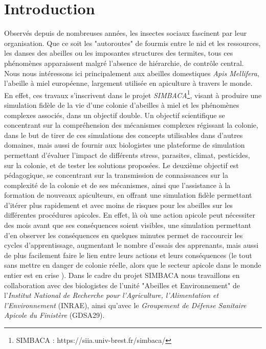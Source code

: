 \chapter*{Introduction}


	Observés depuis de nombreuses années, les insectes sociaux fascinent par leur organisation. Que ce soit les "autoroutes" de fourmis entre le nid et les ressources, les danses des abeilles ou les imposantes structures des termites, tous ces phénomènes apparaissent malgré l'absence de hiérarchie, de contrôle central. Nous nous intéressons ici principalement aux abeilles domestiques \textit{Apis Mellifera}, l'abeille à miel européenne, largement utilisée en apiculture à travers le monde. 
	En effet, ces travaux s'inscrivent dans le projet \textit{SIMBACA}\footnote{SIMBACA : https://siia.univ-brest.fr/simbaca/}, visant à produire une simulation fidèle de la vie d'une colonie d'abeilles à miel et les phénomènes complexes associés, dans un objectif double. Un objectif scientifique se concentrant sur la compréhension des mécanismes complexes régissant la colonie, dans le but de tirer de ces simulations des concepts utilisables dans d'autres domaines, mais aussi de fournir aux biologistes une plateforme de simulation permettant d'évaluer l'impact de différents stress, parasites, climat, pesticides, sur la colonie, et de tester les solutions proposées. 
	Le deuxième objectif est pédagogique, se concentrant sur la transmission de connaissances sur la complexité de la colonie et de ses mécanismes, ainsi que l'assistance à la formation de nouveaux apiculteurs, en offrant une simulation fidèle permettant d'itérer plus rapidement et avec moins de risques pour les abeilles sur les différentes procédures apicoles. En effet, là où une action apicole peut nécessiter des mois avant que ses conséquences soient visibles, une simulation permettant d'en observer les conséquences en quelques minutes permet de raccourcir les cycles d'apprentissage, augmentant le nombre d'essais des apprenants, mais aussi de plus facilement faire le lien entre leurs actions et leurs conséquences (le tout sans mettre en danger de colonie réelle, alors que le secteur apicole dans le monde entier est en crise \cite{johnson_honey_2010}). Dans le cadre du projet SIMBACA nous travaillons en collaboration avec des biologistes de l'unité "Abeilles et Environnement" de l'\textit{Institut National de Recherche pour l'Agriculture, l'Alimentation et l'Environnement} (INRAE), ainsi qu'avec le \textit{Groupement de Défense Sanitaire Apicole du Finistère} (GDSA29).

